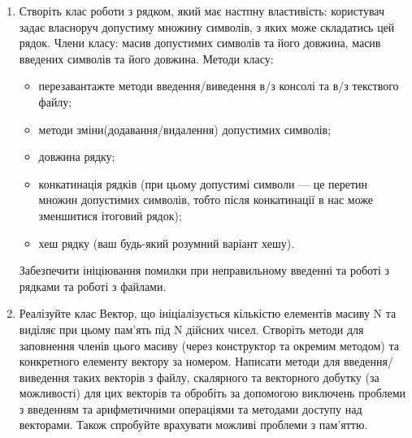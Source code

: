 \documentclass[]{article}
\begin{document}
\begin{enumerate}
\item
Створіть клас роботи з рядком, який має настпну властивість: 
користувач задає власноруч допустиму множину символів, з яких може складатись цей рядок.
Члени класу: масив допустимих символів та його довжина,
масив введених символів та його довжина.
Методи класу:
\begin{itemize}
\item
перезавантажте методи введення/виведення в/з консолі та в/з текствого файлу;
\item
методи зміни(додавання/видалення) допустимих символів;
\item
довжина рядку;
\item
конкатинація рядків (при цьому допустимі символи --- це перетин 
множин допустимих символів, 
тобто після конкатинації в нас може зменшитися ітоговий рядок);
\item
хеш рядку (ваш будь-який розумний варіант хешу).
\end{itemize}
Забезпечити ініціювання помилки при неправильному введенні та роботі з рядками 
та роботі з файлами.

\item

Реалізуйте клас Вектор, що ініціалізується кількістю елементів масиву N
  та виділяє при цьому пам'ять під N дійсних чисел. Створіть методи для
  заповнення членів цього масиву (через конструктор та окремим методом)
  та конкретного елементу вектору за номером. 
  Написати методи для введення/виведення таких векторів з файлу,
  скалярного та векторного добутку (за можливості) для цих векторів та обробіть
  за допомогою виключень проблеми з введенням та арифметичними операціями та методами 
 доступу над векторами. Також спробуйте врахувати можливі проблеми з пам'яттю.

 
\end{enumerate}
\end{document}
